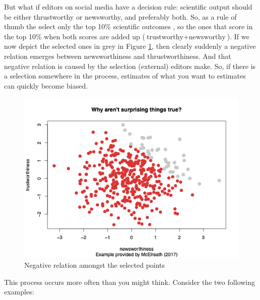 \documentclass[
]{book}
\begin{document}
But what if editors on social media have a decision rule: scientific output should be either thrustworthy or newsworthy, and preferably both. So, as a rule of thumb the select only the top 10\% scientific outcomes , so the ones that score in the top 10\% when both scores are added up (\(\text{trustworthy} + \text{newsworthy}\)). If we now depict the selected ones in grey in Figure \ref{fig:Rplot01}, then clearly suddenly a negative relation emerges between newsworthiness and thrustworthiness. And that negative relation is caused by the selection (external) editors make. So, if there is a selection somewhere in the process, estimates of what you want to estimates can quickly become biased.

\begin{figure}

{\centering \includegraphics[width=600px]{./figures/Rplot01} 

}

\caption{Negative relation amongst the selected points}\label{fig:Rplot01}
\end{figure}

This process occurs more often than you might think. Consider the two following examples:
\end{document}
